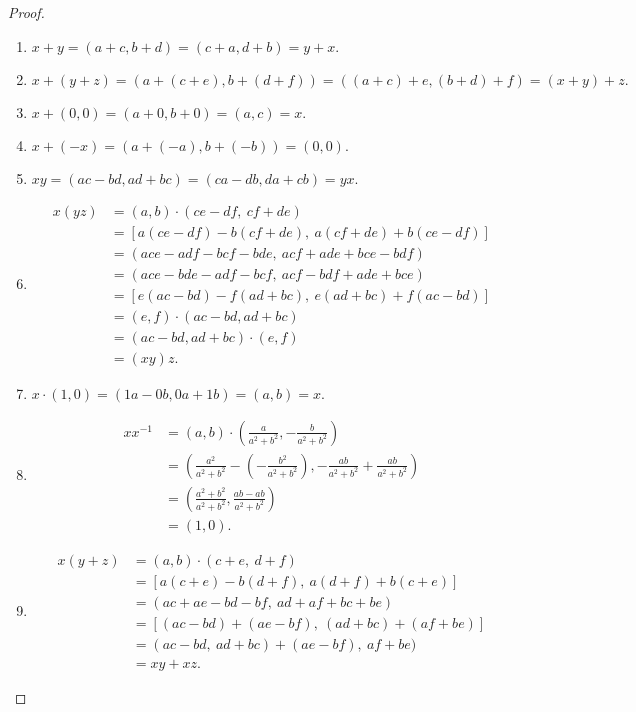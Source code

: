 \documentclass[12pt]{article}
\begin{document}
\begin{thm}
\begin{proof}
    \begin{enumerate}
      \item
        $x + y = (a + c, b + d) = (c + a, d + b) = y + x.$
      \item
        $x + (y + z) = (a + (c + e), b + (d + f)) = ((a + c) + e, (b + d) + f) = (x +
        y) + z.$
      \item
        $x + (0,0) = (a + 0, b + 0) = (a,c) = x.$
      \item
        $x + (-x) = (a + (-a), b + (-b)) = (0,0).$
      \item
        $xy = (ac - bd, ad + bc) = (ca - db, da + cb) = yx.$
      \item
        \begin{align*}
          x(yz) &= (a,b) \cdot (ce - df,\ cf + de)\\
          &= [a(ce - df) - b(cf + de),\ a(cf + de) + b(ce - df)]\\
          &= (ace - adf - bcf - bde,\ acf + ade + bce - bdf)\\
          &= (ace - bde - adf - bcf,\ acf - bdf + ade + bce)\\
          &= [e(ac - bd) - f(ad + bc),\ e(ad + bc) + f(ac - bd)]\\
          &= (e,f) \cdot (ac - bd, ad + bc)\\
          &= (ac - bd, ad + bc) \cdot (e,f)\\
          &= (xy)z.
        \end{align*}
      \item
        $x \cdot (1,0) = (1a - 0b, 0a + 1b) = (a,b) = x.$
      \item
        \begin{align*}
          xx^{-1} &= (a,b) \cdot
          \left(\frac{a}{a^{2} + b^{2}},-\frac{b}{a^{2} + b^{2}}\right)\\
          &=
          \left(\frac{a^{2}}{a^{2} + b^{2}}
                - \left(-\frac{b^2}{a^{2} + b^{2}}\right),
                -\frac{ab}{a^{2} + b^{2}} + \frac{ab}{a^{2} + b^{2}}
          \right)\\
          &=
          \left(\frac{a^{2} + b^{2}}{a^{2} + b^{2}},
                \frac{ab - ab}{a^{2} + b^{2}}
          \right)\\
          &= (1, 0).
        \end{align*}
      \item
        \begin{align*}
          x(y + z) &= (a,b) \cdot (c + e,\ d + f)\\
          &= [a(c + e) - b(d + f),\ a(d + f) + b(c + e)]\\
          &= (ac + ae - bd - bf,\ ad + af + bc + be)\\
          &= [(ac - bd) + (ae - bf),\ (ad + bc) + (af + be)]\\
          &= (ac - bd,\ ad + bc) + (ae - bf),\ af + be)\\
          &= xy + xz.
        \end{align*}
    \end{enumerate}
  \end{proof}
\end{thm}
\end{document}
